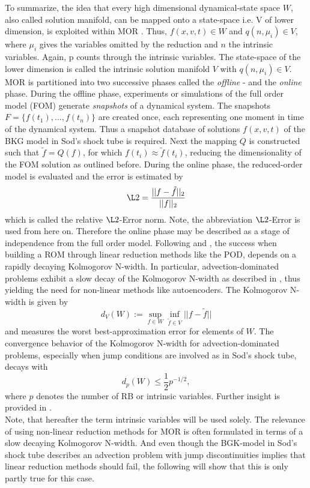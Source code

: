 To summarize, the idea that every high dimensional dynamical-state space \(W\), also called solution
manifold, can be mapped onto a state-space i.e. V of lower dimension, is exploited within MOR \cite{ohlberger2015reduced}. Thus, \(f(x, v, t) \in W\) and \(q(n,\mu_i) \in V\), where \(\mu_i\) gives the variables omitted by the reduction and \(n\) the intrinsic variables. Again, p counts through the intrinsic variables. The state-space of the lower dimension is called the intrinsic solution manifold \(V\) with \(q(n, \mu_i) \in V\)\cite{Carlberg}.
MOR is partitioned into two successive phases called the \textit{offline} - and the \textit{online} phase. During the offline phase, experiments or simulations of the full order model (FOM) generate \textit{snapshots} of a dynamical system. The snapshots \(F = \{f(t_1),...,f(t_n)\}\) are created once, each representing one moment in time of the dynamical system. Thus a snapshot database of solutions \(f(x,v,t)\) of the BKG model in Sod's shock tube is required. Next the mapping \(Q\) is constructed such that \(\tilde{f} = Q(f)\), for which \(f(t_i) \approx \tilde{f}(t_i)\), reducing the dimensionality of the FOM solution as outlined before. During the online phase, the reduced-order model is evaluated and the error is estimated by
\begin{equation}
	\L2 = \frac{||f - \tilde{f} ||_2}{||f||_2}
\end{equation}
which is called the relative \(\L2\)-Error norm. Note, the abbreviation \(\L2\)-Error is used from here on. Therefore the online phase may be described as a stage of independence from the full order model. Following \cite{ohlberger2015reduced} and \cite{Carlberg}, the success when building a ROM through linear reduction methods like the POD, depends on a rapidly decaying Kolmogorov N-width. In particular, advection-dominated problems exhibit a slow decay of the Kolmogorov N-width as described in \cite{ohlberger2015reduced}, thus yielding the need for non-linear methods like autoencoders. The Kolmogorov N-width is given by
\begin{equation}
	d_{V}(W):= \sup_{f \in W} \inf_{\tilde{f} \in V} ||f-\tilde{f}||
	\label{Eq:Kolmogorov}
\end{equation}
and measures the worst best-approximation error for elements of \(W\). The convergence behavior of the Kolmogorov N-width for advection-dominated problems, especially when jump conditions are involved as in Sod's shock tube, decays with
\begin{equation}
	d_p(W) \leq \frac{1}{2} p^{-1/2},
	\label{Eq:KolmoAdv}
\end{equation}
where \(p\) denotes the number of RB or intrinsic variables. Further insight is provided in \cite{ohlberger2015reduced}.\\
Note, that hereafter the term intrinsic variables will be used solely. The relevance of using non-linear reduction methods for MOR is often formulated in terms of a slow decaying Kolmogorov N-width. And even though the BGK-model in Sod's shock tube describes an advection problem with jump discontinuities implies that linear reduction methods should fail, the following will show that this is only partly true for this case.

